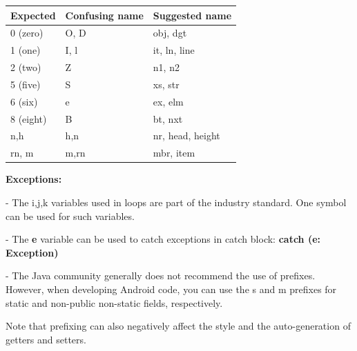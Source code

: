 {{{{{{{{{{{{\begin{center}

\begin{tabular}{ |p{5.0cm}|p{5.0cm}|p{5.0cm}| }

\hline

Expected&Confusing name&Suggested name\\

\hline

 0 (zero)      & O, D                     & obj, dgt         \\

 1 (one)       & I, l                     & it, ln, line     \\

 2 (two)       & Z                        & n1, n2           \\

 5 (five)      & S                        & xs, str          \\

 6 (six)       & e                        & ex, elm          \\

 8 (eight)     & B                        & bt, nxt          \\

 n,h           & h,n                      & nr, head, height \\

 rn, m         & m,rn                     & mbr, item        \\

\hline

\end{tabular}

\end{center}

\textbf{Exceptions:}

- The i,j,k variables used in loops are part of the industry standard. One symbol can be used for such variables.

- The \textbf{e} variable can be used to catch exceptions in catch block: \textbf{catch (e: Exception) {}}

- The Java community generally does not recommend the use of prefixes. However, when developing Android code, you can use the s and m prefixes for static and non-public non-static fields, respectively.

Note that prefixing can also negatively affect the style and the auto-generation of getters and setters.



}}}}}}}}}}}}
